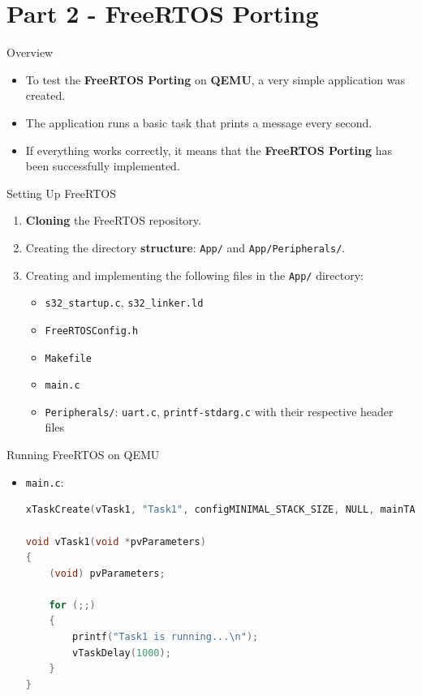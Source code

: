 
\section{Part 2 - FreeRTOS Porting}

\begin{frame}{Overview}
    \begin{itemize}
        \item To test the \textbf{FreeRTOS Porting} on \textbf{QEMU}, a very simple application was created.
        \item The application runs a basic task that prints a message every second.
        \item If everything works correctly, it means that the \textbf{FreeRTOS Porting} has been successfully implemented.
    \end{itemize}
\end{frame}

\begin{frame}{Setting Up FreeRTOS}
    \begin{enumerate}
        \item \textbf{Cloning} the FreeRTOS repository.
        \item Creating the directory \textbf{structure}: \texttt{App/} and \texttt{App/Peripherals/}.
        \item Creating and implementing the following files in the \texttt{App/} directory:
            \begin{itemize}
                \item \texttt{s32\_startup.c}, \texttt{s32\_linker.ld}
                \item \texttt{FreeRTOSConfig.h}
                \item \texttt{Makefile}
                \item \texttt{main.c}
                \item \texttt{Peripherals/}: \texttt{uart.c}, \texttt{printf-stdarg.c} with their respective header files
            \end{itemize}
    \end{enumerate}
\end{frame}

%     
%     
% 

\begin{frame}[fragile]{Running FreeRTOS on QEMU}
    \begin{itemize}
        \item \texttt{main.c}:
            \begin{lstlisting}[language=C]
xTaskCreate(vTask1, "Task1", configMINIMAL_STACK_SIZE, NULL, mainTASK_PRIORITY, NULL);

void vTask1(void *pvParameters) 
{
    (void) pvParameters;

    for (;;) 
    {
        printf("Task1 is running...\n");
        vTaskDelay(1000);
    }
}
            \end{lstlisting}
    \end{itemize}
\end{frame}

